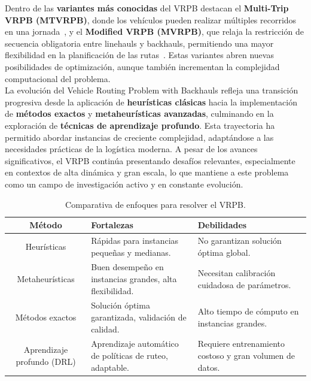 \documentclass[letter, 10pt]{article}
\begin{document}
Dentro de las \textbf{variantes m\'as conocidas} del VRPB destacan el \textbf{Multi-Trip VRPB (MTVRPB)}, donde los veh\'iculos pueden realizar m\'ultiples recorridos en una jornada~\cite{sethanan2020hybrid}, y el \textbf{Modified VRPB (MVRPB)}, que relaja la restricci\'on de secuencia obligatoria entre linehauls y backhauls, permitiendo una mayor flexibilidad en la planificaci\'on de las rutas~\cite{sukhpal2023multitrip}. Estas variantes abren nuevas posibilidades de optimizaci\'on, aunque tambi\'en incrementan la complejidad computacional del problema.\\

La evoluci\'on del Vehicle Routing Problem with Backhauls refleja una transici\'on progresiva desde la aplicaci\'on de \textbf{heur\'isticas cl\'asicas} hacia la implementaci\'on de \textbf{m\'etodos exactos} y \textbf{metaheur\'isticas avanzadas}, culminando en la exploraci\'on de \textbf{t\'ecnicas de aprendizaje profundo}. Esta trayectoria ha permitido abordar instancias de creciente complejidad, adapt\'andose a las necesidades pr\'acticas de la log\'istica moderna. A pesar de los avances significativos, el VRPB contin\'ua presentando desaf\'ios relevantes, especialmente en contextos de alta din\'amica y gran escala, lo que mantiene a este problema como un campo de investigaci\'on activo y en constante evoluci\'on.



\begin{table}[H]
\centering
\begin{tabular}{|c|p{5cm}|p{5cm}|}
\hline
\textbf{M\'etodo} & \textbf{Fortalezas} & \textbf{Debilidades} \\
\hline
Heur\'isticas & R\'apidas para instancias peque\~nas y medianas. & No garantizan soluci\'on \'optima global. \\
\hline
Metaheur\'isticas & Buen desempe\~no en instancias grandes, alta flexibilidad. & Necesitan calibraci\'on cuidadosa de par\'ametros. \\
\hline
M\'etodos exactos & Soluci\'on \'optima garantizada, validaci\'on de calidad. & Alto tiempo de c\'omputo en instancias grandes. \\
\hline
Aprendizaje profundo (DRL) & Aprendizaje autom\'atico de pol\'iticas de ruteo, adaptable. & Requiere entrenamiento costoso y gran volumen de datos. \\
\hline
\end{tabular}
\caption{Comparativa de enfoques para resolver el VRPB.}
\label{tab:comparativa}
\end{table}
\end{document}
